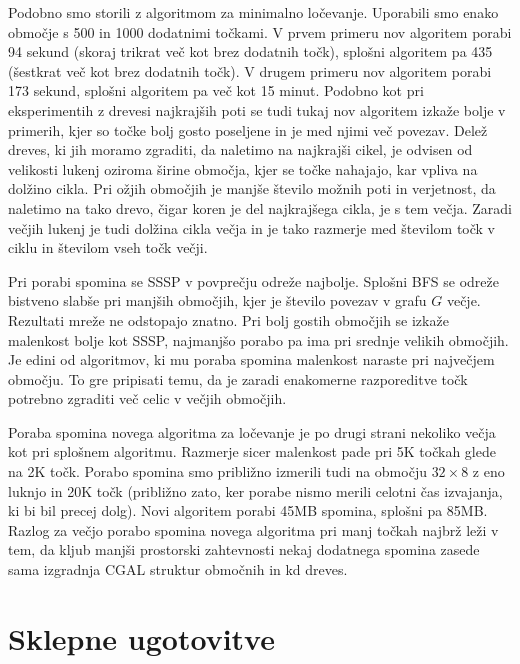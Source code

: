 \documentclass[a4paper, 12pt]{book}
\begin{document}
Podobno smo storili z algoritmom za minimalno ločevanje. Uporabili smo enako območje s 500 in 1000 dodatnimi točkami. V prvem primeru nov algoritem porabi 94 sekund (skoraj trikrat več kot brez dodatnih točk), splošni algoritem pa 435 (šestkrat več kot brez dodatnih točk). V drugem primeru nov algoritem porabi 173 sekund, splošni algoritem pa več kot 15 minut. Podobno kot pri eksperimentih z drevesi najkrajših poti se tudi tukaj nov algoritem izkaže bolje v primerih, kjer so točke bolj gosto poseljene in je med njimi več povezav. Delež dreves, ki jih moramo zgraditi, da naletimo na najkrajši cikel, je odvisen od velikosti lukenj oziroma širine območja, kjer se točke nahajajo, kar vpliva na dolžino cikla. Pri ožjih območjih je manjše število možnih poti in verjetnost, da naletimo na tako drevo, čigar koren je del najkrajšega cikla, je s tem večja. Zaradi večjih lukenj je tudi dolžina cikla večja in je tako razmerje med številom točk v ciklu in številom vseh točk večji.

Pri porabi spomina se SSSP v povprečju odreže najbolje. Splošni BFS se odreže bistveno slabše pri manjših območjih, kjer je število povezav v grafu $G$ večje. Rezultati mreže ne odstopajo znatno. Pri bolj gostih območjih se izkaže malenkost bolje kot SSSP, najmanjšo porabo pa ima pri srednje velikih območjih. Je edini od algoritmov, ki mu poraba spomina malenkost naraste pri največjem območju. To gre pripisati temu, da je zaradi enakomerne razporeditve točk potrebno zgraditi več celic v večjih območjih. 

Poraba spomina novega algoritma za ločevanje je po drugi strani nekoliko večja kot pri splošnem algoritmu. Razmerje sicer malenkost pade pri 5K točkah glede na 2K točk. Porabo spomina smo približno izmerili tudi na območju $32\times 8$ z eno luknjo in 20K točk (približno zato, ker porabe nismo merili celotni čas izvajanja, ki bi bil precej dolg). Novi algoritem porabi 45MB spomina, splošni pa 85MB. Razlog za večjo porabo spomina novega algoritma pri manj točkah najbrž leži v tem, da kljub manjši prostorski zahtevnosti nekaj dodatnega spomina zasede sama izgradnja CGAL struktur območnih in kd dreves. 


\chapter{Sklepne ugotovitve}
\label{ch4}
\end{document}
